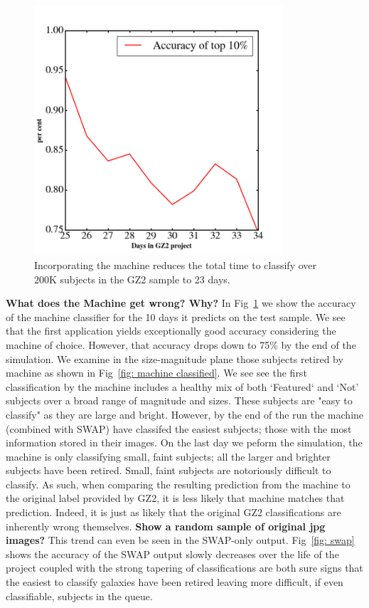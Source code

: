 \documentclass[twocolumn]{aastex6}
\begin{document}
\begin{figure}[t!]
\includegraphics[width=3.65in]{figures/MLevaluation_GZ2_sup_PLPD5_p5_flipfeature2b_RF_accuracy.png}
\caption{Incorporating the machine reduces the total time to classify over 200K subjects in the GZ2 sample to 23 days. \label{fig: machine accuracy}}
\end{figure}

\textbf{What does the Machine get wrong? Why?}  In Fig~\ref{fig: machine accuracy} 
we show the accuracy of the machine classifier for the 10 days it predicts on the test sample. 
We see that the first application yields exceptionally good accuracy considering
the machine of choice. However, that accuracy drops down to 75\% by the end of the simulation.
We examine in the size-magnitude plane those  subjects retired by machine as 
shown in Fig~\ref{fig: machine classified}.  We see see the first classification by
the machine includes a healthy mix of both `Featured` and `Not' subjects over a 
broad range of magnitude and sizes. These subjects are "easy to classify" as they are
large and bright. However, by the end of the run the machine (combined with SWAP)
have classifed the easiest subjects; those with the most information stored in their images. 
On the last day we peform the simulation, the machine is only classifying small, faint 
subjects; all the larger and brighter subjects have been retired. Small, faint subjects are 
notoriously difficult to classify. As such, when comparing the resulting prediction from
the machine to the original label provided by GZ2, it is less likely that machine matches
that prediction. Indeed, it is just as likely that the original GZ2 classifications are inherently 
wrong themselves. \textbf{Show a random sample of original jpg images? } 
This trend can even be seen in the SWAP-only output. 
Fig~\ref{fig: swap} shows the accuracy of the SWAP output slowly decreases 
over the life of the project coupled with the strong tapering of classifications 
are both sure signs that the easiest to classify galaxies have been retired leaving
more difficult, if even classifiable, subjects in the queue. 
\end{document}

